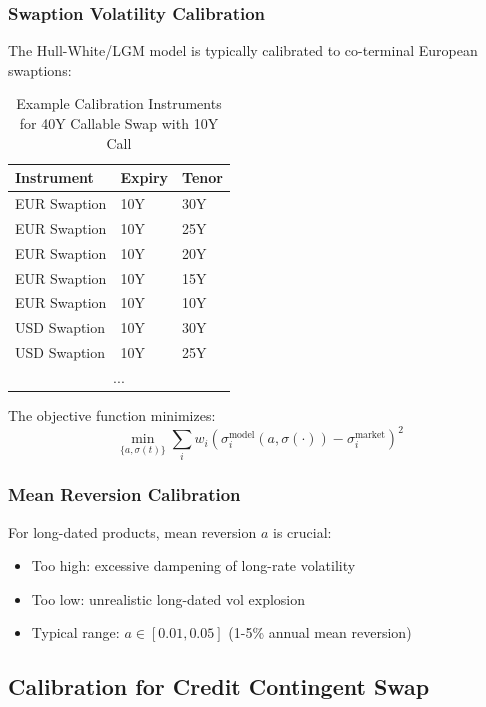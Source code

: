 \documentclass[11pt,a4paper]{article}
\theoremstyle{definition}
\begin{document}
\subsubsection{Swaption Volatility Calibration}

The Hull-White/LGM model is typically calibrated to co-terminal European swaptions:

\begin{table}[h]
\centering
\caption{Example Calibration Instruments for 40Y Callable Swap with 10Y Call}
\label{tab:calib_inst}
\begin{tabular}{lll}
\toprule
\textbf{Instrument} & \textbf{Expiry} & \textbf{Tenor} \\
\midrule
EUR Swaption & 10Y & 30Y \\
EUR Swaption & 10Y & 25Y \\
EUR Swaption & 10Y & 20Y \\
EUR Swaption & 10Y & 15Y \\
EUR Swaption & 10Y & 10Y \\
\midrule
USD Swaption & 10Y & 30Y \\
USD Swaption & 10Y & 25Y \\
\multicolumn{3}{c}{...} \\
\bottomrule
\end{tabular}
\end{table}

The objective function minimizes:
\begin{equation}
\min_{\{a, \sigma(t)\}} \sum_{i} w_i \left( \sigma^{\text{model}}_i(a, \sigma(\cdot)) - \sigma^{\text{market}}_i \right)^2
\end{equation}

\subsubsection{Mean Reversion Calibration}

For long-dated products, mean reversion $a$ is crucial:
\begin{itemize}
    \item Too high: excessive dampening of long-rate volatility
    \item Too low: unrealistic long-dated vol explosion
    \item Typical range: $a \in [0.01, 0.05]$ (1-5\% annual mean reversion)
\end{itemize}

\subsection{Calibration for Credit Contingent Swap}
\end{document}
